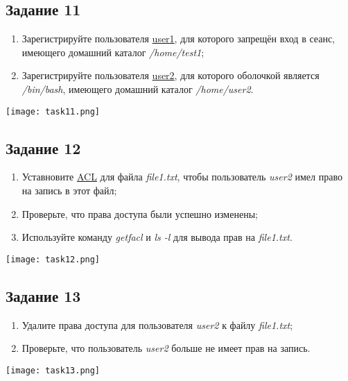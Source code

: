 \documentclass[12pt, a4paper]{report}
\begin{document}
	\subsection*{Задание 11}
	\begin{enumerate}
		\item Зарегистрируйте пользователя \underline{user1}, для которого запрещён вход в сеанс, имеющего домашний каталог \textit{/home/test1};
		\item Зарегистрируйте пользователя \underline{user2}, для которого оболочкой является \textit{/bin/bash}, имеющего домашний каталог \textit{/home/user2}.
	\end{enumerate}
	\lstset{style=mystyle}
	
	\begin{center}
		\texttt{[image: task11.png]}
	\end{center}

	\subsection*{Задание 12}
	\begin{enumerate}
		\item Уставновите \underline{ACL} для файла \textit{file1.txt}, чтобы пользователь \textit{user2} имел право на запись в этот файл;
		\item Проверьте, что права доступа были успешно изменены;
		\item Используйте команду \textit{getfacl} и \textit{ls -l} для вывода прав на \textit{file1.txt}.
	\end{enumerate}
	\lstset{style=mystyle}
	
	\begin{center}
		\texttt{[image: task12.png]}
	\end{center}

	\subsection*{Задание 13}
	\begin{enumerate}
		\item Удалите права доступа для пользователя \textit{user2} к файлу \textit{file1.txt};
		\item Проверьте, что пользователь \textit{user2} больше не имеет прав на запись.
	\end{enumerate}
	\lstset{style=mystyle}
	
	\begin{center}
		\texttt{[image: task13.png]}
	\end{center}
\end{document}
